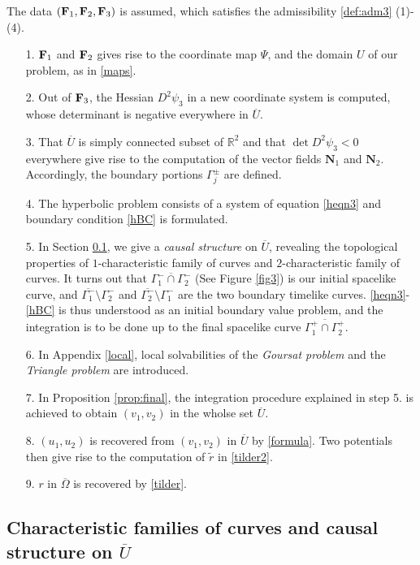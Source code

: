 \documentclass[11pt]{amsart}
\theoremstyle{plain}
\theoremstyle{remark}
\numberwithin{equation}{section}
\numberwithin{Thm}{section}
\def\U{\overline{U}}
\def\N{{\mathbf N}}
\def\F{{\bf F}}
\begin{document}
The data $(\F_1,\F_2,\F_3)$ is assumed, which satisfies the admissibility \ref{def:adm3} (1)-(4). 
\begin{enumerate}
 \item[1.] $\F_1$ and $\F_2$ gives rise to the coordinate map $\Psi$, and the domain $U$ of our problem, as in \eqref{maps}.
 \item[2.] Out of $\F_3$, the Hessian $D^2\psi_3$ in a new coordinate system is computed, whose determinant is negative everywhere in $\U$.
 \item[3.] That $\U$ is simply connected subset of $\mathbb{R}^2$ and that $\det D^2\psi_3 < 0$ everywhere give rise to the computation of the vector fields $\N_1$ and $\N_2$. Accordingly, the boundary portions $\Gamma^\pm_j$ are defined.
 \item[4.] The hyperbolic problem consists of a system of equation \eqref{heqn3} and boundary condition \eqref{hBC} is formulated.
 \item[5.] In Section \ref{causal}, we give a {\it causal structure} on $\U$, revealing the topological properties of $1$-characteristic family of curves and $2$-characteristic family of curves. It turns out that $\overline{\Gamma^-_1 \cap \Gamma^-_2}$  (See Figure \ref{fig3}) is our initial spacelike curve, and $\overline{\Gamma^-_1} \setminus \Gamma^-_2$ and $\overline{\Gamma^-_2} \setminus \Gamma^-_1$ are the two boundary timelike curves. \eqref{heqn3}-\eqref{hBC} is thus understood as an initial boundary value problem, and the integration is to be done up to the final spacelike curve $\overline{\Gamma^+_1 \cap \Gamma^+_2}$. 
 \item[6.] In Appendix \ref{local}, local solvabilities of the {\it Goursat problem} and the {\it Triangle problem} are introduced. 
 \item[7.] In Proposition \ref{prop:final}, the integration procedure explained in step 5. is achieved to obtain $(v_1,v_2)$  in the wholse set $\U$. 
 \item[8.] $(u_1,u_2)$ is recovered from $(v_1,v_2)$ in $\U$ by \eqref{formula}. Two potentials then give rise to the computation of $\tilde {r}$ in \eqref{tilder2}.
 \item[9.] $r$ in $\overline{\Omega}$ is recovered by \eqref{tilder}.
\end{enumerate}





\subsection{Characteristic families of curves and causal structure on $\U$} \label{causal}
\end{document}
